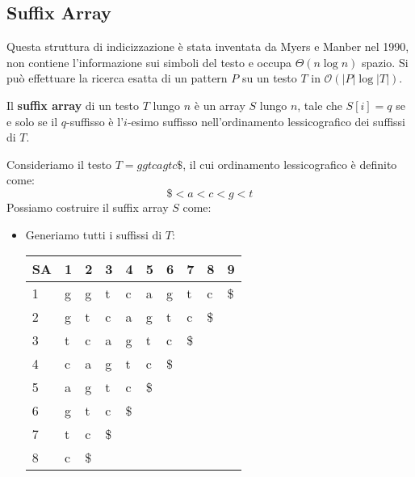 \subsection{Suffix Array}
Questa struttura di indicizzazione è stata inventata da Myers e Manber nel 1990,
non contiene l'informazione sui simboli del testo e occupa $\Theta(n \log n)$ spazio.
Si può effettuare la ricerca esatta di un pattern $P$  su un testo $T$ in
$\mathcal{O}(|P| \log |T|)$.
\begin{definizione}
    Il \textbf{suffix array} di un testo $T$ lungo $n$ è un array $S$ lungo $n$,
    tale che $S[i]= q$ se e solo se il $q$-suffisso è l'$i$-esimo suffisso
    nell'ordinamento lessicografico dei suffissi di $T$.
\end{definizione}
\begin{esempio}
    Consideriamo il testo $T = ggtcagtc\$$, il cui ordinamento lessicografico è
    definito come:
    \begin{equation}
        \$ < a < c < g < t
    \end{equation}
    Possiamo costruire il suffix array $S$ come:
    \begin{itemize}
        \item Generiamo tutti i suffissi di $T$:
              \begin{table}[!ht]
                  \centering
                  \begin{tabular}{|l|l|l|l|l|l|l|l|l|l|}
                      \hline
                      SA & 1  & 2  & 3  & 4  & 5  & 6  & 7  & 8  & 9  \\ \hline
                      1  & g  & g  & t  & c  & a  & g  & t  & c  & \$ \\ \hline
                      2  & g  & t  & c  & a  & g  & t  & c  & \$ & ~  \\ \hline
                      3  & t  & c  & a  & g  & t  & c  & \$ & ~  & ~  \\ \hline
                      4  & c  & a  & g  & t  & c  & \$ & ~  & ~  & ~  \\ \hline
                      5  & a  & g  & t  & c  & \$ & ~  & ~  & ~  & ~  \\ \hline
                      6  & g  & t  & c  & \$ & ~  & ~  & ~  & ~  & ~  \\ \hline
                      7  & t  & c  & \$ & ~  & ~  & ~  & ~  & ~  & ~  \\ \hline
                      8  & c  & \$ & ~  & ~  & ~  & ~  & ~  & ~  & ~  \\ \hline

\end{tabular}
\end{table}
\end{itemize}
\end{esempio}
